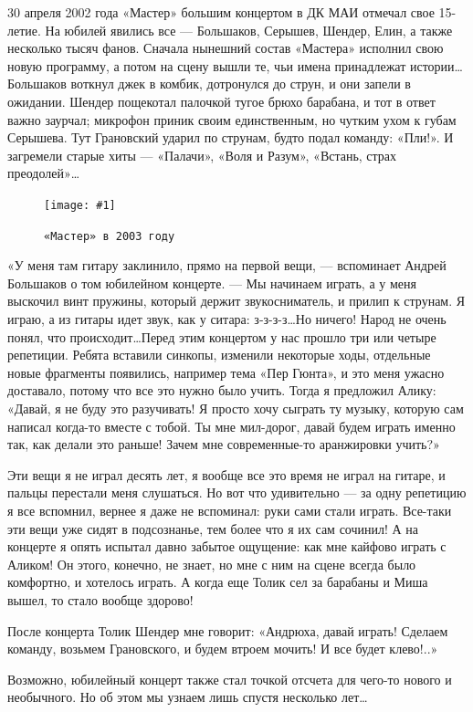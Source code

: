 \documentclass[16pt,a5paper]{book}
\newcommand{\myincludegraphics}[1]{\texttt{[image: \#1]}}
\begin{document}
30 апреля 2002 года «Мастер» большим концертом в ДК МАИ отмечал свое 15-летие. На юбилей явились все — Большаков,
Серышев, Шендер, Елин, а также несколько тысяч фанов. Сначала нынешний состав «Мастера» исполнил свою новую программу, а
потом на сцену вышли те, чьи имена принадлежат истории\ldots Большаков воткнул джек в комбик, дотронулся до струн, и они
запели в ожидании. Шендер пощекотал палочкой тугое брюхо барабана, и тот в ответ важно заурчал; микрофон приник своим
единственным, но чутким ухом к губам Серышева. Тут Грановский ударил по струнам, будто подал команду: «Пли!». И
загремели старые хиты — «Палачи», «Воля и Разум», «Встань, страх преодолей»\ldots

\begin{figure}[h]
    \centering
    \myincludegraphics{Image36}
    \caption{\texttt{«Мастер» в 2003 году}}
\end{figure}

«У меня там гитару заклинило, прямо на первой вещи, — вспоминает Андрей Большаков о том юбилейном концерте. — Мы
начинаем играть, а у меня выскочил винт пружины, который держит звукосниматель, и прилип к струнам. Я играю, а из гитары
идет звук, как у ситара: з-з-з-з\ldots Но ничего! Народ не очень понял, что происходит\ldots Перед этим концертом у нас
прошло три или четыре репетиции. Ребята вставили синкопы, изменили некоторые ходы, отдельные новые фрагменты появились,
например тема «Пер Гюнта», и это меня ужасно доставало, потому что все это нужно было учить. Тогда я предложил Алику:
«Давай, я не буду это разучивать! Я просто хочу сыграть ту музыку, которую сам написал когда-то вместе с тобой. Ты мне
мил-дорог, давай будем играть именно так, как делали это раньше! Зачем мне современные-то аранжировки учить?»

Эти вещи я не играл десять лет, я вообще все это время не играл на гитаре, и пальцы перестали меня слушаться. Но вот что
удивительно — за одну репетицию я все вспомнил, вернее я даже не вспоминал: руки сами стали играть. Все-таки эти вещи
уже сидят в подсознанье, тем более что я их сам сочинил! А на концерте я опять испытал давно забытое ощущение: как мне
кайфово играть с Аликом! Он этого, конечно, не знает, но мне с ним на сцене всегда было комфортно, и хотелось играть. А
когда еще Толик сел за барабаны и Миша вышел, то стало вообще здорово!

После концерта Толик Шендер мне говорит: «Андрюха, давай играть! Сделаем команду, возьмем Грановского, и будем втроем
мочить! И все будет клево!..»

Возможно, юбилейный концерт также стал точкой отсчета для чего-то нового и необычного. Но об этом мы узнаем лишь спустя
несколько лет\ldots
\end{document}
